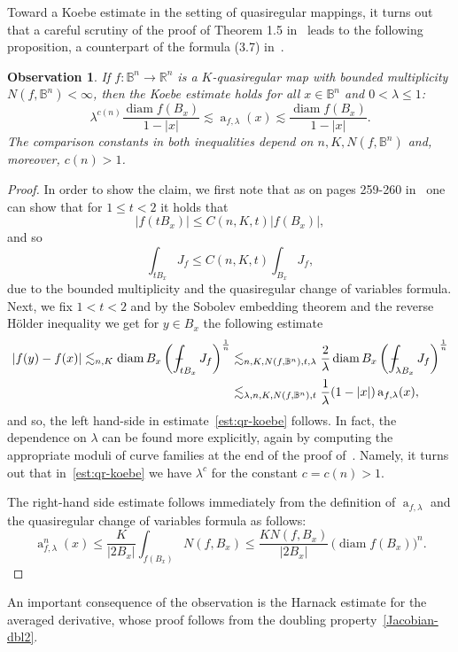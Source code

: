 \documentclass[11pt,a4paper,reqno]{amsart}
\newtheorem{obs}{Observation}[section]
\theoremstyle{definition}
\def\vint{\mathop{\mathchoice%
          {\setbox0\hbox{$\displaystyle\intop$}\kern 0.22\wd0%
           \vcenter{\hrule width 0.6\wd0}\kern -0.82\wd0}%
          {\setbox0\hbox{$\textstyle\intop$}\kern 0.2\wd0%
           \vcenter{\hrule width 0.6\wd0}\kern -0.8\wd0}%
          {\setbox0\hbox{$\scriptstyle\intop$}\kern 0.2\wd0%
           \vcenter{\hrule width 0.6\wd0}\kern -0.8\wd0}%
          {\setbox0\hbox{$\scriptscriptstyle\intop$}\kern 0.2\wd0%
           \vcenter{\hrule width 0.6\wd0}\kern -0.8\wd0}}%
          \mathopen{}\int}
\renewcommand{\a}{\operatorname{a}}
\newcommand{\B}{\mathbb{B}^n}
\newcommand{\Rn}{{\mathbb R}^n}
\newcommand{\diam}{\operatorname{diam}}
\numberwithin{komcounter}{section}
\begin{document}
Toward a Koebe estimate in the setting of quasiregular mappings, it turns out that a careful scrutiny of the proof of Theorem 1.5 in~\cite{hk} leads to the following proposition, a counterpart of the formula (3.7) in~\cite{hk}.

\begin{obs} If $f:\B\to \Rn$ is a $K$-quasiregular map with bounded multiplicity $N(f,\B)<\infty$, then the Koebe estimate holds for all $x\in \B$ and $0<\lambda\leq 1$:
\begin{equation}\label{est:qr-koebe}
\lambda^{c(n)} \frac{\diam f(B_x)}{1-|x|} \lesssim \a_{f, \lambda}(x) \lesssim \frac{\diam f(B_x)}{1-|x|}.
\end{equation}
The comparison constants in both inequalities depend on $n, K, N(f,\B)$ and, moreover, $c(n)>1$.
\end{obs}

\begin{proof}
In order to show the claim, we first note that as on pages 259-260 in~\cite{hk} one can show that for $1\leq t<2$ it holds that 
\begin{equation*}%
|f(t B_x)|\leq C(n, K, t) |f(B_x)|,
\end{equation*}
and so 
\begin{equation}\label{Jacobian-dbl2}
\int_{tB_x} J_f \leq C(n, K, t) \int_{B_x} J_f,
\end{equation}
due to the bounded multiplicity and the quasiregular change of variables formula. Next, we fix $1<t<2$ and by the Sobolev embedding theorem and the reverse H\"older inequality we get for $y\in B_x$ the following estimate
\begin{align*}
 |f(y)-f(x)|\lesssim_{n, K} \diam B_x \left(\vint_{tB_x} J_f \right)^{\frac1n} &\lesssim_{n,K,N(f,\B), t, \lambda} \frac{2}{\lambda} \diam B_x \left(\vint_{\lambda B_x} J_f \right)^{\frac1n} \\
 &\lesssim_{\lambda, n, K, N(f,\B), t} \frac{1}{\lambda} (1-|x|) \a_{f, \lambda}(x),
\end{align*} 
and so, the left hand-side in estimate~\eqref{est:qr-koebe} follows. In fact, the dependence on $\lambda$ can be found more explicitly, again by computing the appropriate moduli of curve families at the end of the proof of~\cite[Theorem 1.5]{hk}. Namely, it turns out that in~\eqref{est:qr-koebe} we have $\lambda^{c}$ for the constant $c=c(n)>1$.
 
The right-hand side estimate follows immediately from the definition of $\a_{f,\lambda}$ and the quasiregular change of variables formula as follows:
\[
 \a_{f,\lambda}^n(x)\leq \frac{K}{|2B_x|} \int_{f(B_x)} N(f, B_x) \leq \frac{K N(f, B_x)}{|2B_x|}\,\big(\diam f(B_x)\big)^n.
\]
\end{proof}
An important consequence of the observation is the Harnack estimate for the averaged derivative, whose proof follows from the doubling property~\eqref{Jacobian-dbl2}.
 
\end{document}
